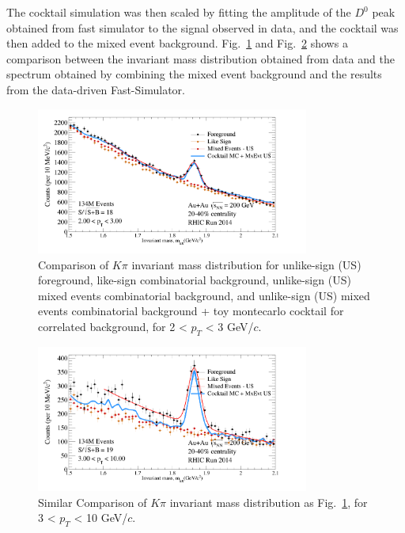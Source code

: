 \documentclass[a4paper]{article}
\begin{document}
The cocktail simulation was then scaled by fitting the amplitude of the $D^0$ peak obtained from fast simulator to the signal observed in data, and the cocktail was then added to the mixed event background. Fig.~\ref{fig:bump1} and Fig.~\ref{fig:bump2} shows a comparison between the invariant mass distribution obtained from data and the spectrum obtained by combining the mixed event background and the results from the data-driven Fast-Simulator.

\begin{figure}[htbp]
\centering
\includegraphics[keepaspectratio,width=0.8\textwidth]{fig/D0_FG_EvMxBg_coktail_2040_2_pT_3.png}
\caption{Comparison of $K\pi$ invariant mass distribution for unlike-sign (US) foreground, like-sign combinatorial background, unlike-sign (US) mixed events combinatorial background, and unlike-sign (US) mixed events combinatorial background + toy montecarlo cocktail for correlated background, for 2 < $p_T$ < 3 GeV/$c$.}
\label{fig:bump1}
\end{figure}

\begin{figure}[htbp]
\centering
\includegraphics[keepaspectratio,width=0.8\textwidth]{fig/D0_FG_EvMcBg_cocktail_2040_3_pT_10.png}
\caption{Similar Comparison of $K\pi$ invariant mass distribution as Fig.~\ref{fig:bump1}, for 3 < $p_T$ < 10 GeV/$c$.}
\label{fig:bump2}
\end{figure}
\end{document}
